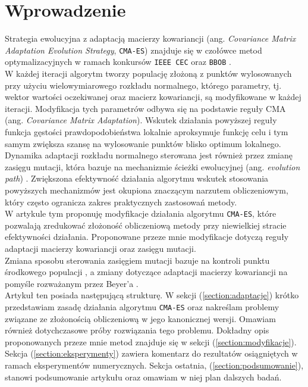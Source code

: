 \section{Wprowadzenie}
\label{section:wprowadzenie}
Strategia ewolucyjna z adaptacją macierzy kowariancji (ang.\textit{ Covariance Matrix Adaptation Evolution Strategy}, \texttt{CMA-ES}) \cite{cmaes} znajduje się w czołówce metod optymalizacyjnych w ramach konkursów \texttt{IEEE CEC} \cite{cec2017} oraz \texttt{BBOB} \cite{HansenEtal10}. \\ \indent W każdej iteracji algorytm tworzy populację złożoną z punktów wylosowanych przy użyciu wielowymiarowego rozkładu normalnego, którego parametry, tj. wektor wartości oczekiwanej oraz macierz kowariancji, są modyfikowane w każdej iteracji. Modyfikacja tych parametrów odbywa się na podstawie reguły CMA (ang. \textit{Covariance Matrix Adaptation}). Wskutek działania powyższej reguły funkcja gęstości prawdopodobieństwa lokalnie aproksymuje funkcję celu i tym samym zwiększa szansę na wylosowanie punktów blisko optimum lokalnego. Dynamika adaptacji rozkładu normalnego sterowana jest również przez zmianę zasięgu mutacji, która bazuje na mechanizmie ścieżki ewolucyjnej (ang. \textit{evolution path}) \cite{Hansen2001}. Zwiększona efektywność działania algorytmu wskutek stosowania powyższych mechanizmów jest okupiona znaczącym narzutem obliczeniowym, który często ogranicza zakres praktycznych zastosowań metody.\\
\indent W artykule tym proponuję modyfikacje działania algorytmu \texttt{CMA-ES}, które pozwalają zredukować złożoność obliczeniową metody przy niewielkiej stracie efektywności działania. Proponowane przeze mnie modyfikacje dotyczą reguły adaptacji macierzy kowariancji oraz zasięgu mutacji.\\ Zmiana sposobu sterowania zasięgiem mutacji bazuje na kontroli punktu środkowego populacji \cite{Arabas17}, a zmiany dotyczące adaptacji macierzy kowariancji na pomyśle rozważanym przez Beyer'a \cite{SMAES}. \\
\indent Artykuł ten posiada następującą strukturę. W sekcji (\ref{section:adaptacje}) krótko przedstawiam zasadę działania algorytmu \texttt{CMA-ES} oraz nakreślam problemy związane ze złożonością obliczeniową w jego kanonicznej wersji. Omawiam również dotychczasowe próby rozwiązania tego problemu. Dokładny opis proponowanych przeze mnie metod znajduje się w sekcji (\ref{section:modyfikacje}). Sekcja (\ref{section:eksperymenty}) zawiera komentarz do rezultatów osiągniętych w ramach eksperymentów numerycznych. Sekcja ostatnia, (\ref{section:podsumowanie}), stanowi podsumowanie artykułu oraz omawiam w niej plan dalszych badań.

